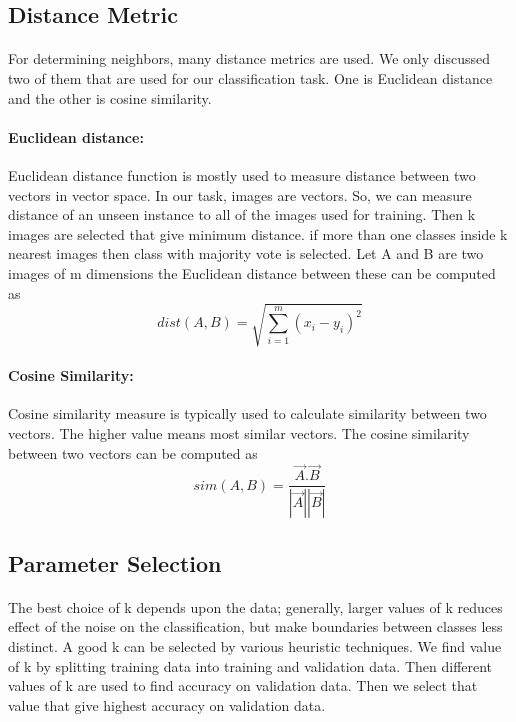 \documentclass[]{report}
\begin{document}
\subsection{Distance Metric}
\paragraph{}For determining neighbors, many distance metrics are used. We only discussed two of them that are used for our classification task. One is Euclidean distance and the other is cosine similarity.
\paragraph{Euclidean distance:}
Euclidean distance function is mostly used to measure distance between two vectors in vector space. In our task, images are vectors. So, we can measure distance of an unseen instance to all of the images used for training. Then k images are selected that give minimum distance. if more than one classes inside k nearest images then class with majority vote is selected. Let A and B are two images of m dimensions the Euclidean distance between these can be computed as
\begin{equation}\label{Euclidean distance formula}dist(A,B)=\sqrt{{\sum_{i=1}^{m}}(x_{i}-y_{i})^2}\end{equation}

\paragraph{Cosine Similarity:}
Cosine similarity measure is typically used to calculate similarity between two vectors. The higher value means most similar vectors. The cosine similarity between two vectors can be computed as 
\begin{equation}\label{Cosine similarity Formula}
sim(A,B)= \frac{\vec{A}.\vec{B}}{|\vec{A}||\vec{B}|}
\end{equation}
\subsection{Parameter Selection}
\paragraph{}The best choice of k depends upon the data; generally, larger values of k reduces effect of the noise on the classification, but make boundaries between classes less distinct. A good k can be selected by various heuristic techniques. We find value of k by splitting training data into training and validation data. Then different values of k are used to find accuracy on validation data. Then we select that value that give highest accuracy on validation data.
\end{document}

